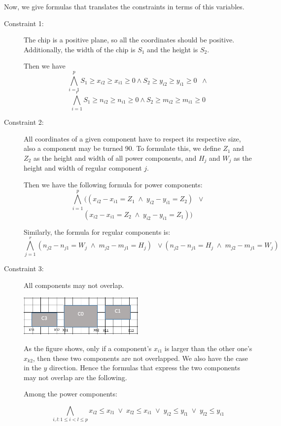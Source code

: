 Now, we give formulas that translates the constraints in terms of this variables.

\begin{description}
  \item[Constraint 1:] The chip is a positive plane, so all the coordinates should be positive. Additionally, the width of the chip is $S_1$ and the height is $S_2$.

  Then we have
  \[  \bigwedge_{i=1}^p S_1 \geq x_{i2} \geq x_{i1} \geq 0 \wedge S_2 \geq y_{i2} \geq y_{i1} \geq 0 \;\; \wedge \]
  \[  \bigwedge_{i=1}^r S_1 \geq n_{i2} \geq n_{i1} \geq 0 \wedge S_2 \geq m_{i2} \geq m_{i1} \geq 0 \]


  \item[Constraint 2:] All coordinates of a given component have to respect its respective size, also a component may be turned 90. To formulate this, we define $Z_1$ and $Z_2$ as the height and width of all power components, and $H_{j}$ and $W_{j}$ as the height and width of regular component $j$.

  Then we have the following formula for power components:
  \[  \bigwedge_{i=1}^p ((x_{i2} - x_{i1} = Z_1 \; \wedge \; y_{i2} - y_{i1} = Z_2) \;\; \vee \]
  \[ (x_{i2} - x_{i1} = Z_2 \; \wedge \; y_{i2} - y_{i1} = Z_1)) \]

  Similarly, the formula for regular components is:
  \[  \bigwedge_{j=1}^r (n_{j2} - n_{j1} = W_j \; \wedge \; m_{j2} - m_{j1} = H_j) \;\; \vee (n_{j2} - n_{j1} = H_j \; \wedge \; m_{j2} - m_{j1} = W_j) \]


  \item[Constraint 3:] All components may not overlap.

\begin{center}
\includegraphics[width=0.5\textwidth]{Part1_2_1.png}
\end{center}
  As the figure shows, only if a component's $x_{i1}$ is larger than the other one's $x_{k2}$, then these two components are not overlapped. We also have the case in the $y$ direction. Hence the formulas that express the two components may not overlap are the following.

  Among the power components:

  \[  \bigwedge_{i,l: 1 \leq i < l \leq p}
  x_{i2} \leq x_{l1} \; \vee \; x_{l2} \leq x_{i1} \; \vee \; y_{i2} \leq y_{l1} \; \vee \; y_{l2} \leq y_{i1} \]


\end{description}
